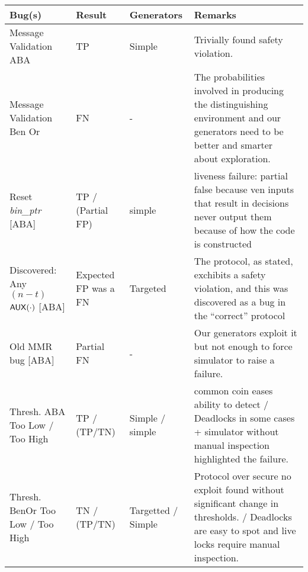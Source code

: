 \begin{center}
\begin{tabularx}{\textwidth}{ || p{} | p{} | p{} | p{} || }
\hline \hline
Bug(s) & Result & Generators & Remarks
\\ \hline
Message Validation ABA & TP & Simple  & Trivially found safety violation.
\\ \hline
Message Validation Ben Or & {\color{blue} FN} & - & The probabilities involved in producing the distinguishing environment and our generators need to be better and smarter about exploration.
\\ \hline
Reset \emph{bin\_ptr} [ABA] & TP / (Partial FP) & simple & liveness failure: partial false because ven inputs that result in decisions never output them because of how the code is constructed
\\ \hline
{\color{red} Discovered: Any $(n-t)$ ${\mathsf {AUX}}(\cdot)$ [ABA]} & Expected FP was a FN & Targeted  & The protocol, as stated, exchibits a safety violation, and this was discovered as a bug in the ``correct'' protocol 
\\ \hline
Old MMR bug [ABA] & Partial FN & - & Our generators exploit it but not enough to force simulator to raise a failure.
\\ \hline 
Thresh. ABA Too Low / Too High & TP / (TP/TN) & Simple / simple & common coin eases ability to detect / Deadlocks in some cases + simulator without manual inspection highlighted the failure.
\\ \hline
Thresh. BenOr Too Low / Too High & TN / (TP/TN) & Targetted / Simple & Protocol over secure no exploit found without significant change in thresholds. / Deadlocks are easy to spot and live locks require manual inspection. 
\\ \hline

\end{tabularx}
\end{center}
